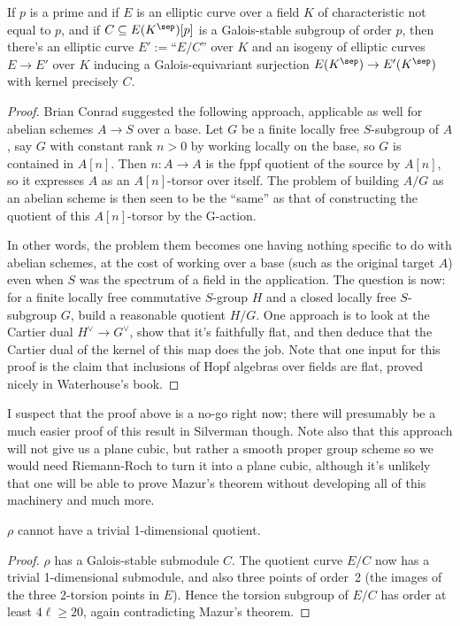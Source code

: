 \begin{theorem}\label{Elliptic_curve_quotient_by_finite_subgroup}\notready If $p$ is a prime and
  if $E$ is an elliptic curve over a field $K$ of characteristic not equal to $p$,
   and if $C\subseteq E(K^{\sep})[p]$ is a Galois-stable
  subgroup of order $p$, then there's an elliptic curve $E':=$``$E/C$'' over $K$ and an isogeny of elliptic
  curves $E\to E'$ over $K$ inducing a Galois-equivariant surjection $E(K^{\sep})\to E'(K^{\sep})$
  with kernel precisely $C$.
\end{theorem}
\begin{proof}
  Brian Conrad suggested the following approach, applicable as well for abelian schemes $A\to S$
  over a base.  Let $G$ be a finite locally free $S$-subgroup of $A$, say $G$ with constant
  rank $n > 0$ by working locally on the base, so $G$ is contained in $A[n]$.  Then
  $n: A \to A$ is the fppf quotient of the source by $A[n]$, so it expresses $A$ as an
  $A[n]$-torsor over itself.  The problem of building $A/G$ as an abelian scheme is then
  seen to be the “same” as that of constructing the quotient of this $A[n]$-torsor by the G-action.

  In other words, the problem them becomes one having nothing specific to do with abelian schemes,
  at the cost of working over a base (such as the original target $A$) even when $S$ was the
  spectrum of a field in the application. The question is now: for a finite locally free
  commutative $S$-group $H$ and a closed locally free $S$-subgroup $G$, build a reasonable quotient
  $H/G$. One approach is to look at the Cartier dual $H^\vee\to G^\vee$, show that it's faithfully
  flat, and then deduce that the Cartier dual of the kernel of this map does the job. Note that
  one input for this proof is the claim that inclusions of Hopf algebras over fields are flat,
  proved nicely in Waterhouse’s book.
\end{proof}

I suspect that the proof above is a no-go right now; there will presumably be a much easier proof of this result in Silverman though. Note also that this approach will not
give us a plane cubic, but rather a smooth proper group scheme so we would need Riemann-Roch
to turn it into a plane cubic, although it's unlikely that one will be able to prove Mazur's
theorem without developing all of this machinery and much more.

\begin{corollary}\label{Frey_curve_no_trivial_quotient} $\rho$ cannot have a trivial 1-dimensional quotient.
\end{corollary}
\begin{proof} $\rho$ has a Galois-stable submodule $C$. The quotient curve $E/C$ now has
  a trivial 1-dimensional submodule, and also three points of order~2 (the images of the three
  2-torsion points in $E$). Hence the torsion subgroup of $E/C$ has order at least $4\ell\geq 20$,
  again contradicting Mazur's theorem.
\end{proof}

